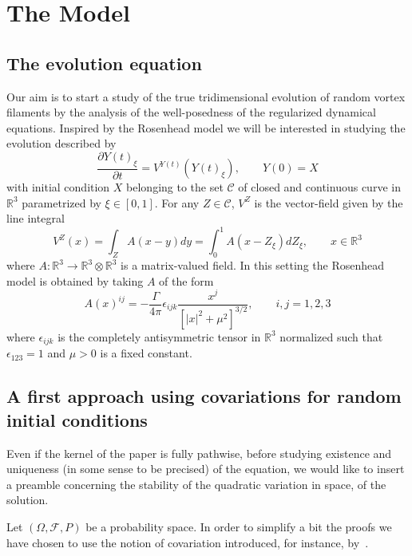 \documentclass[a4paper,12pt,reqno]{amsart}
\newcommand{\RR}{\mathbb{R}^3}
\newcommand{\CC}{\mathscr{C}}
\begin{document}
\section{The Model}
\label{sec:model}
\subsection{The evolution  equation}



Our aim is to start a study of the true tridimensional evolution of
random vortex filaments by the analysis of the well-posedness of the
regularized dynamical equations.
Inspired by the Rosenhead model we will be
 interested in studying the  evolution described by
\begin{equation}
  \label{eq:evolution}
\frac{\partial Y(t)_\xi}{\partial t} = V^{Y(t)}(Y(t)_\xi), \qquad Y(0)
= X
\end{equation}
with initial condition $X$ belonging to the set $\CC$ of  closed and
continuous curve in $\RR$ parametrized by $\xi \in [0,1]$. For any $Z
\in \CC$,  $V^{Z}$ is the vector-field given by the line integral
\begin{equation}
  \label{eq:evolutionV}
  V^{Z}(x) = \int_Z A(x-y) dy = \int_0^1 A(x-Z_\xi) dZ_\xi, \qquad x \in \mathbb{R}^3
\end{equation}
where $A : \RR \to \RR \otimes \RR$ is a matrix-valued field.
In this setting the Rosenhead model is obtained by taking $A$ of the form
$$
A(x)^{ij} = -\frac{\Gamma}{4\pi} \epsilon_{ijk}
\frac{x^j}{[|x|^2+\mu^2]^{3/2}} 
,\qquad i,j = 1,2,3
$$
where $\epsilon_{ijk}$ is the completely antisymmetric tensor in
$\mathbb{R}^3$ normalized such that $\epsilon_{123}=1$ and $\mu > 0$ is a fixed constant.

\subsection{A first approach using covariations for random initial conditions}
\label{sec:quad-var}
Even if the kernel of the paper is fully pathwise,  
before studying existence and uniqueness (in some sense to be precised) of the equation, 
we would like to insert a preamble
concerning the stability of  the quadratic variation in space, of the solution.

Let $(\Omega, {\mathcal F}, P)$ be a probability space.
In order to simplify a bit the proofs we have chosen to use the notion
of covariation introduced, for instance, by~\cite{rv95}.  
\end{document}
